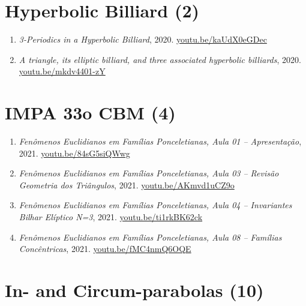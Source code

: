 \documentclass[12pt]{article}
\begin{document}
\section{Hyperbolic Billiard (2)}

\begin{enumerate}[resume]
\item \textit{3-Periodics in a Hyperbolic Billiard}, 2020. \href{https://youtu.be/kaUdX0eGDec}{\url{youtu.be/kaUdX0eGDec}}
\item \textit{A triangle, its elliptic billiard, and three associated hyperbolic billiards}, 2020. \href{https://youtu.be/mkdv4401-zY}{\url{youtu.be/mkdv4401-zY}}
\end{enumerate}

\section{IMPA 33o CBM (4)}

\begin{enumerate}[resume]
\item \textit{Fenômenos Euclidianos em Famílias Ponceletianas, Aula 01 -- Apresentação}, 2021. \href{https://youtu.be/84sG5siQWwg}{\url{youtu.be/84sG5siQWwg}}
\item \textit{Fenômenos Euclidianos em Famílias Ponceletianas, Aula 03 -- Revisão Geometria dos Triângulos}, 2021. \href{https://youtu.be/AKmvd1uCZ9o}{\url{youtu.be/AKmvd1uCZ9o}}
\item \textit{Fenômenos Euclidianos em Famílias Ponceletianas, Aula 04 -- Invariantes Bilhar Elíptico N=3}, 2021. \href{https://youtu.be/ti1rkBK62ck}{\url{youtu.be/ti1rkBK62ck}}
\item \textit{Fenômenos Euclidianos em Famílias Ponceletianas, Aula 08 -- Famílias Concêntricas}, 2021. \href{https://youtu.be/fMC4nmQ6OQE}{\url{youtu.be/fMC4nmQ6OQE}}
\end{enumerate}

\section{In- and Circum-parabolas (10)}
\end{document}
